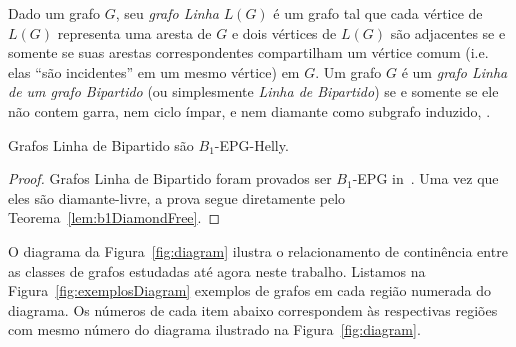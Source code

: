 Dado um grafo $G$, seu \textit{grafo Linha} $L(G)$ é um grafo tal que cada vértice de $L(G)$ representa uma aresta de  $G$ e dois  vértices de $L(G)$ são adjacentes se e somente se suas arestas correspondentes compartilham um vértice comum (i.e. elas ``são incidentes'' em um mesmo vértice) em $G$.  
Um grafo $G$ é um \textit{grafo Linha de um grafo Bipartido} (ou simplesmente \textit{Linha de Bipartido}) se e somente se ele não contem  garra, nem ciclo ímpar, e nem diamante como subgrafo induzido, \cite{harary1974line}.



\begin{corollary}\label{coro:lineOfBipartido}
 Grafos Linha de Bipartido são $B_1$-EPG-Helly. 
\end{corollary}

\begin{proof}
Grafos Linha de Bipartido foram provados ser $B_1$-EPG in~\cite{golumbic2018edge}. Uma vez que eles são diamante-livre, a prova segue diretamente pelo Teorema~\ref{lem:b1DiamondFree}.
\end{proof}

O diagrama da Figura~\ref{fig:diagram}
ilustra o relacionamento de continência entre as classes de grafos estudadas até agora neste trabalho.  
Listamos na Figura~\ref{fig:exemplosDiagram} exemplos de grafos em cada região numerada do diagrama. Os números de cada item abaixo correspondem às respectivas regiões com mesmo número do diagrama ilustrado na Figura~\ref{fig:diagram}.




